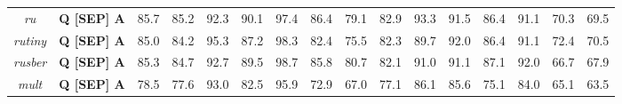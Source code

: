 \begin{table*}
{\begin{tabular}{|c|c||c|c|c|c|c|c|c|c|c|c|c|c|c|c|}
\textit{ru} &  \textbf{Q [SEP] A} & 85.7 & 85.2 & 92.3 & 90.1 & 97.4 & 86.4 & 79.1 & 82.9 & 93.3 & 91.5 & 86.4 & 91.1 & 70.3 & 69.5\\ %
\textit{rutiny} &  \textbf{Q [SEP] A} & 85.0 & 84.2 & 95.3 & 87.2 & 98.3 & 82.4 & 75.5 & 82.3 & 89.7 & 92.0 & 86.4 & 91.1 & 72.4 & 70.5\\ %
\textit{rusber} &  \textbf{Q [SEP] A} & 85.3 & 84.7 & 92.7 & 89.5 & 98.7 & 85.8 & 80.7 & 82.1 & 91.0 & 91.1 & 87.1 & 92.0 & 66.7 & 67.9\\ %
\textit{mult} &  \textbf{Q [SEP] A} & 78.5 & 77.6 & 93.0 & 82.5 & 95.9 & 72.9 & 67.0 & 77.1 & 86.1 & 85.6 & 75.1 & 84.0 & 65.1 & 63.5\\ \hline
\end{tabular}
}
\end{table*}

